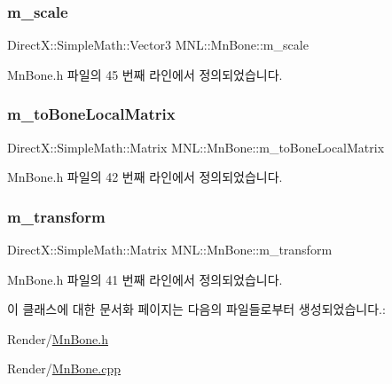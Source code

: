 \subsubsection{\texorpdfstring{m\+\_\+scale}{m\_scale}}
{\footnotesize\ttfamily Direct\+X\+::\+Simple\+Math\+::\+Vector3 M\+N\+L\+::\+Mn\+Bone\+::m\+\_\+scale\hspace{0.3cm}{\ttfamily [private]}}



Mn\+Bone.\+h 파일의 45 번째 라인에서 정의되었습니다.

\mbox{\label{class_m_n_l_1_1_mn_bone_a99bbff737e6e67c9be126bcf6be0c3b5}} 
\subsubsection{\texorpdfstring{m\+\_\+to\+Bone\+Local\+Matrix}{m\_toBoneLocalMatrix}}
{\footnotesize\ttfamily Direct\+X\+::\+Simple\+Math\+::\+Matrix M\+N\+L\+::\+Mn\+Bone\+::m\+\_\+to\+Bone\+Local\+Matrix\hspace{0.3cm}{\ttfamily [private]}}



Mn\+Bone.\+h 파일의 42 번째 라인에서 정의되었습니다.

\mbox{\label{class_m_n_l_1_1_mn_bone_aea47d357de786e87817f49963ae22bea}} 
\subsubsection{\texorpdfstring{m\+\_\+transform}{m\_transform}}
{\footnotesize\ttfamily Direct\+X\+::\+Simple\+Math\+::\+Matrix M\+N\+L\+::\+Mn\+Bone\+::m\+\_\+transform\hspace{0.3cm}{\ttfamily [private]}}



Mn\+Bone.\+h 파일의 41 번째 라인에서 정의되었습니다.



이 클래스에 대한 문서화 페이지는 다음의 파일들로부터 생성되었습니다.\+:\begin{DoxyCompactItemize}
\item 
Render/\hyperlink{_mn_bone_8h}{Mn\+Bone.\+h}\item 
Render/\hyperlink{_mn_bone_8cpp}{Mn\+Bone.\+cpp}\end{DoxyCompactItemize}
